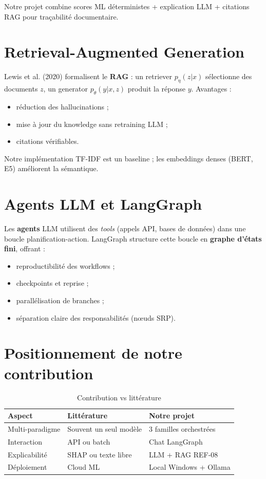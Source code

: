 Notre projet combine scores ML déterministes + explication LLM + citations RAG pour traçabilité documentaire.

\section{Retrieval-Augmented Generation}

Lewis et al. (2020) formalisent le \textbf{RAG} : un retriever $p_\eta(z|x)$ sélectionne des documents $z$, un generator $p_\theta(y|x,z)$ produit la réponse $y$. Avantages :
\begin{itemize}[leftmargin=*]
  \item réduction des hallucinations ;
  \item mise à jour du knowledge sans retraining LLM ;
  \item citations vérifiables.
\end{itemize}

Notre implémentation TF-IDF est un baseline ; les embeddings denses (BERT, E5) améliorent la sémantique.

\section{Agents LLM et LangGraph}

Les \textbf{agents} LLM utilisent des \textit{tools} (appels API, bases de données) dans une boucle planification-action. LangGraph structure cette boucle en \textbf{graphe d'états fini}, offrant :
\begin{itemize}[leftmargin=*]
  \item reproductibilité des workflows ;
  \item checkpoints et reprise ;
  \item parallélisation de branches ;
  \item séparation claire des responsabilités (nœuds SRP).
\end{itemize}

\section{Positionnement de notre contribution}

\begin{table}[H]
  \centering
  \caption{Contribution vs littérature}
  \begin{tabular}{|p{4cm}|p{5cm}|p{4cm}|}
    \hline
    \textbf{Aspect} & \textbf{Littérature} & \textbf{Notre projet} \\
    \hline
    Multi-paradigme & Souvent un seul modèle & 3 familles orchestrées \\
    \hline
    Interaction & API ou batch & Chat LangGraph \\
    \hline
    Explicabilité & SHAP ou texte libre & LLM + RAG REF-08 \\
    \hline
    Déploiement & Cloud ML & Local Windows + Ollama \\
    \hline
  \end{tabular}
\end{table}

